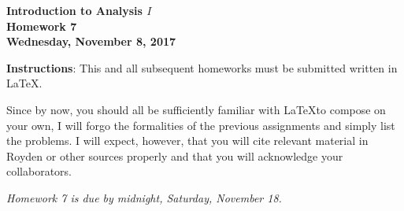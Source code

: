 \documentclass{article}%
\begin{document}
\begin{center}
\textbf{Introduction to Analysis $I$\\Homework 7\\Wednesday, November  8, 
2017}\bigskip
\end{center}

\noindent\textbf{Instructions}: This and all subsequent homeworks must be submitted written in \LaTeX.

\noindent Since by now, you should all be sufficiently familiar with \LaTeX to 
compose on your own, I will forgo the formalities of the previous assignments 
and simply list the problems.  I will expect, however, that you will cite 
relevant material in Royden or other sources properly and that you will 
acknowledge your collaborators.


\begin{center}
\emph{Homework 7 is due by midnight, Saturday, November 18.}
\end{center} 
\medskip
\end{document}
